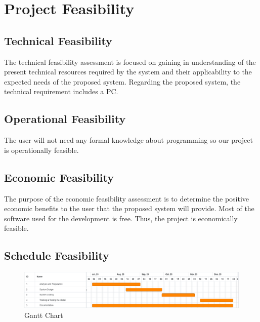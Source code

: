 \section{Project Feasibility}
\vspace{-18pt}
\subsection{Technical Feasibility}
\vspace{-18pt}
The technical feasibility assessment is focused on gaining in understanding of the present technical resources required by the system and their applicability to the expected needs of the proposed system. Regarding the proposed system, the technical requirement includes a PC.
\vspace{-18pt}
\subsection{Operational Feasibility}
\vspace{-18pt}
The user will not need any formal knowledge about programming so our project is operationally feasible.
\vspace{-18pt}
\subsection{Economic Feasibility}
\vspace{-18pt}
The purpose of the economic feasibility assessment is to determine the positive economic benefits to the user that the proposed system will provide. Most of the software used for the development is free. Thus, the project is economically feasible.
\vspace{-18pt}
\subsection{Schedule Feasibility}
\begin{figure}[!h] %
\begin{center}
	\includegraphics[width=6in]{images/gc3.png} 
	\caption{Gantt Chart} %
	\label{figGanttChart} %
\end{center}
\end{figure}

